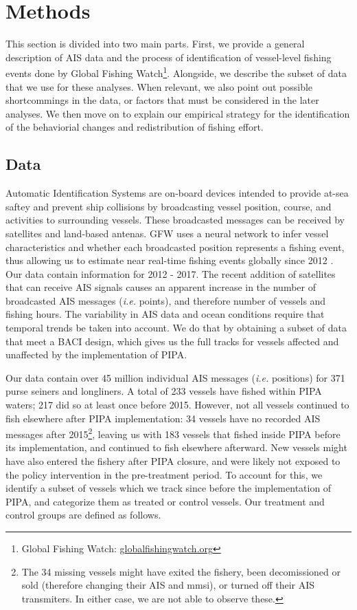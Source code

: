 \documentclass[12pt,]{article}
\let\rmarkdownfootnote\footnote%
\def\footnote{\protect\rmarkdownfootnote}
\begin{document}
\section{Methods}\label{methods}

This section is divided into two main parts. First, we provide a general
description of AIS data and the process of identification of
vessel-level fishing events done by Global Fishing Watch\footnote{Global
  Fishing Watch: \url{globalfishingwatch.org}}. Alongside, we describe
the subset of data that we use for these analyses. When relevant, we
also point out possible shortcommings in the data, or factors that must
be considered in the later analyses. We then move on to explain our
empirical strategy for the identification of the behaviorial changes and
redistribution of fishing effort.

\subsection{Data}\label{data}

Automatic Identification Systems are on-board devices intended to
provide at-sea saftey and prevent ship collisions by broadcasting vessel
position, course, and activities to surrounding vessels. These
broadcasted messages can be received by satellites and land-based
antenas. GFW uses a neural network to infer vessel characteristics and
whether each broadcasted position represents a fishing event, thus
allowing us to estimate near real-time fishing events globally since
2012 \citep{kroodsma_2018}. Our data contain information for 2012 -
2017. The recent addition of satellites that can receive AIS signals
causes an apparent increase in the number of broadcasted AIS messages
(\emph{i.e.} points), and therefore number of vessels and fishing hours.
The variability in AIS data and ocean conditions require that temporal
trends be taken into account. We do that by obtaining a subset of data
that meet a BACI design, which gives us the full tracks for vessels
affected and unaffected by the implementation of PIPA.

Our data contain over 45 million individual AIS messages (\emph{i.e.}
positions) for 371 purse seiners and longliners. A total of 233 vessels
have fished within PIPA waters; 217 did so at least once before 2015.
However, not all vessels continued to fish elsewhere after PIPA
implementation: 34 vessels have no recorded AIS messages after
2015\footnote{The 34 missing vessels might have exited the fishery, been
  decomissioned or sold (therefore changing their AIS and mmsi), or
  turned off their AIS transmiters. In either case, we are not able to
  observe these.}, leaving us with 183 vessels that fished inside PIPA
before its implementation, and continued to fish elsewhere afterward.
New vessels might have also entered the fishery after PIPA closure, and
were likely not exposed to the policy intervention in the pre-treatment
period. To account for this, we identify a subset of vessels which we
track since before the implementation of PIPA, and categorize them as
treated or control vessels. Our treatment and control groups are defined
as follows.
\end{document}
